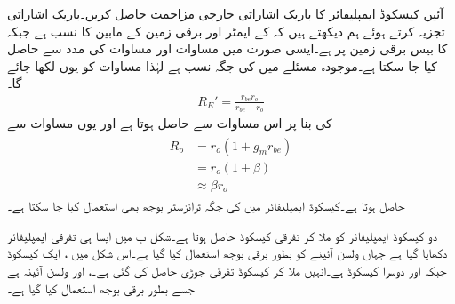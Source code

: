 آئیں کیسکوڈ ایمپلیفائر کا باریک اشاراتی خارجی مزاحمت  حاصل کریں۔باریک اشاراتی تجزیہ کرتے ہوئے ہم دیکھتے ہیں کہ  کے ایمٹر اور برقی زمین کے مابین  کا  نسب ہے جبکہ  کا بیس برقی زمین پر ہے۔ایسی صورت میں مساوات  اور مساوات  کی مدد سے  حاصل کیا جا سکتا ہے۔موجودہ مسئلے میں  کی جگہ  نسب ہے لہٰذا مساوات  کو یوں لکھا جائے گا۔
\begin{align*}
R_E'=\frac{r_{be} r_o}{r_{be}+r_o}
\end{align*}
 کی بنا پر اس مساوات سے  حاصل ہوتا ہے اور یوں مساوات  سے
\begin{gather}
\begin{aligned}\label{مساوات_تفرقی_کیسکوڈ_کی_خارجی_مزاحمت}
R_o&=r_o \left(1+g_m r_{be} \right)\\
&=r_o \left(1+\beta \right)\\
&\approx  \beta r_o
\end{aligned}
\end{gather}
حاصل ہوتا ہے۔کیسکوڈ ایمپلیفائر میں  کی جگہ ٹرانزسٹر بوجھ بھی استعمال کیا جا سکتا ہے۔

دو کیسکوڈ ایمپلیفائر کو ملا کر تفرقی کیسکوڈ حاصل ہوتا ہے۔شکل  ب میں ایسا ہی تفرقی ایمپلیفائر دکھایا گیا ہے جہاں ولسن آئینے کو بطور برقی بوجھ استعمال کیا گیا ہے۔اس شکل میں ،  ایک کیسکوڈ جبکہ   اور  دوسرا کیسکوڈ ہے۔انہیں ملا کر  کیسکوڈ تفرقی جوڑی حاصل کی گئی ہے۔،  اور  ولسن آئینہ ہے جسے بطور برقی بوجھ استعمال کیا گیا ہے۔

